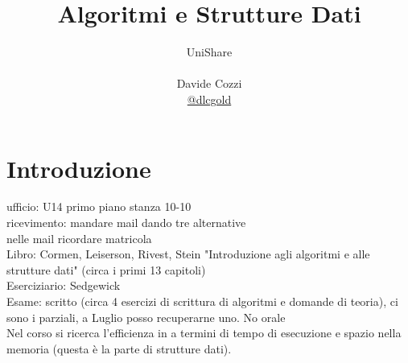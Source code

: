 \documentclass[a4paper,12pt,oneside,tikz]{book}
\title{Algoritmi e Strutture Dati}
\author{UniShare\\\\Davide Cozzi\\\href{https://t.me/dlcgold}{@dlcgold}\\}
\date{}
\begin{document}
\maketitle


\newtheorem{teorema}{Teorema}
\newtheorem{definizione}{Definizione}
\newtheorem{esempio}{Esempio}
\newtheorem{corollario}{Corollario}
\newtheorem{lemma}{Lemma}
\newtheorem{osservazione}{Osservazione}
\newtheorem{nota}{Nota}
\newtheorem{esercizio}{Esercizio}
\tableofcontents
\renewcommand{\chaptermark}[1]{%
\markboth{\chaptername
\ \thechapter.\ #1}{}}
\renewcommand{\sectionmark}[1]{\markright{\thesection.\ #1}}


\chapter{Introduzione}

ufficio: U14 primo piano stanza 10-10\\
ricevimento: mandare mail dando tre alternative\\
nelle mail ricordare matricola\\
Libro: Cormen, Leiserson, Rivest, Stein "Introduzione agli algoritmi e alle strutture dati" (circa i primi 13 capitoli)\\
Eserciziario: Sedgewick\\
Esame: scritto (circa 4 esercizi di scrittura di algoritmi e domande di teoria), ci sono i parziali, a Luglio posso recuperarne uno. No orale \\
Nel corso si ricerca l'efficienza in a termini di tempo di esecuzione e spazio nella memoria (questa è la parte di strutture dati).
\end{document}
